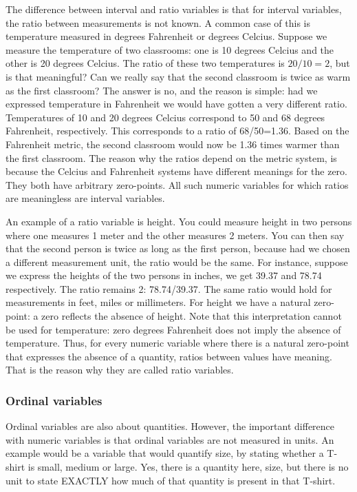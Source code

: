 \documentclass[]{report}\usepackage[]{graphicx}\usepackage[]{color}
\begin{document}
The difference between interval and ratio variables is that for interval variables, the ratio between measurements is not known. A common case of this is temperature measured in degrees Fahrenheit or degrees Celcius. Suppose we measure the temperature of two classrooms: one is 10 degrees Celcius and the other is 20 degrees Celcius. The ratio of these two temperatures is $20/10=2$, but is that meaningful? Can we really say that the second classroom is twice as warm as the first classroom? The answer is no, and the reason is simple: had we expressed temperature in Fahrenheit we would have gotten a very different ratio. Temperatures of 10 and 20 degrees Celcius correspond to 50 and 68 degrees Fahrenheit, respectively. This corresponds to a ratio of 68/50=1.36. Based on the Fahrenheit metric, the second classroom would now be 1.36 times warmer than the first classroom. The reason why the ratios depend on the metric system, is because the Celcius and Fahrenheit systems have different meanings for the zero. They both have arbitrary zero-points. All such numeric variables for which ratios are meaningless are interval variables.

An example of a ratio variable is height. You could measure height in two persons where one measures 1 meter and the other measures 2 meters. You can then say that the second person is twice as long as the first person, because had we chosen a different measurement unit, the ratio would be the same. For instance, suppose we express the heights of the two persons in inches, we get 39.37 and 78.74 respectively. The ratio remains 2: 78.74/39.37. The same ratio would hold for measurements in feet, miles or millimeters. For height we have a natural zero-point: a zero reflects the absence of height. Note that this interpretation cannot be used for temperature: zero degrees Fahrenheit does not imply the absence of temperature. Thus, for every numeric variable where there is a natural zero-point that expresses the absence of a quantity, ratios between values have meaning. That is the reason why they are called ratio variables.



\subsubsection{Ordinal variables}

Ordinal variables are also about quantities. However, the important difference with numeric variables is that ordinal variables are not measured in units. An example would be a variable that would quantify size, by stating whether a T-shirt is small, medium or large. Yes, there is a quantity here, size, but there is no unit to state EXACTLY how much of that quantity is present in that T-shirt.
\end{document}
